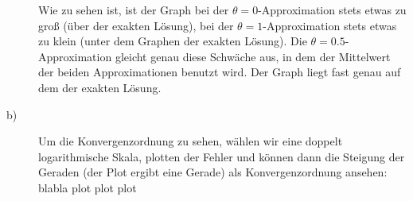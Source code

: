 \documentclass[11pt,a4paper,ngerman]{article}
\begin{document}
\begin{description}
Wie zu sehen ist, ist der Graph bei der $\theta = 0$-Approximation stets etwas zu groß (über der exakten Lösung), bei der $\theta = 1$-Approximation stets etwas zu klein (unter dem Graphen der exakten Lösung). Die $\theta = 0.5$-Approximation gleicht genau diese Schwäche aus, in dem der Mittelwert der beiden Approximationen benutzt wird. Der Graph liegt fast genau auf dem der exakten Lösung.

\item[b)] Um die Konvergenzordnung zu sehen, wählen wir eine doppelt logarithmische Skala, plotten der Fehler und können dann die Steigung der Geraden (der Plot ergibt eine Gerade) als Konvergenzordnung ansehen: \\

blabla plot plot plot
\end{description}




\label{LastPage}
\end{document}
